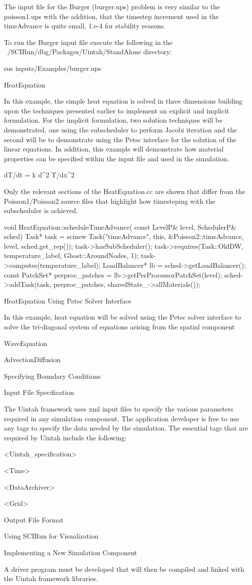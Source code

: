 \documentclass[12pt]{report}
\begin{document}
The input file for the Burger (burger.ups) problem is very similar to the poisson1.ups with the addition, that the timestep increment used in the timeAdvance is quite small, 1.e-4 for stability reasons.

To run the Burger input file execute the following in the ~/SCIRun/dbg/Packages/Uintah/StandAlone directory:

	sus inputs/Examples/burger.ups

HeatEquation

In this example, the simple heat equation is solved in three dimensions building upon the techniques presented earlier to implement an explicit and implicit formulation.  For the implicit formulation, two solution techniques will be demonstrated, one using the subscheduler to perform Jacobi iteration and the second will be to demonstrate using the Petsc interface for the solution of the linear equations.   In addition, this example will demonstrate how material properties can be specified within the input file and used in the simulation.

	dT/dt = k d^2 T/dx^2  


Only the relevant sections of the HeatEquation.cc are shown that differ from the Poisson1/Poisson2 source files that highlight how timesteping with the subscheduler is achieved.

void HeatEquation::scheduleTimeAdvance( const LevelP& level, SchedulerP& sched)
{
  Task* task = scinew Task("timeAdvance",
			this, &Poisson2::timeAdvance,
			level, sched.get_rep());
  task->hasSubScheduler();
  task->requires(Task::OldDW, temperature_label, Ghost::AroundNodes, 1);
  task->computes(temperature_label);
  LoadBalancer* lb = sched->getLoadBalancer();
  const PatchSet* perproc_patches = lb->getPerProcessorPatchSet(level);
  sched->addTask(task, perproc_patches, sharedState_->allMaterials());
}

HeatEquation Using Petsc Solver Interface

In this example, heat equation will be solved using the Petsc solver interface to solve the tri-diagonal system of equations arising from the spatial component

WaveEquation

AdvectionDiffusion

Specifying Boundary Conditions

Input File Specification

The Uintah framework uses xml input files to specify the various parameters required in any simulation component.  The application developer is free to use any tags to specify the data needed by the simulation.  The essential tags that are required by Uintah include the following:

	<Uintah_specification>

	<Time>

	<DataArchiver>

	<Grid>


Output File Format


Using SCIRun for Visualization


Implementing a New Simulation Component

A driver program must be developed that will then be compiled and linked with the Uintah framework libraries.  
\end{document}

